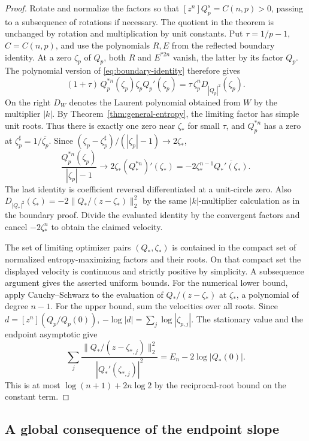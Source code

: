 \documentclass[11pt]{article}
\begin{document}
\begin{proof}
Rotate and normalize the factors so that \([z^n]Q_p^s=C(n,p)>0\),
passing to a subsequence of rotations if necessary. The quotient
in the theorem is unchanged by rotation and multiplication by
unit constants. Put \(\tau=1/p-1\), \(C=C(n,p)\), and use the
polynomials \(R,E\) from the reflected boundary identity. At a
zero \(\zeta_p\) of \(Q_p\), both \(R\) and \(E^{*2n}\) vanish,
the latter by its factor \(Q_p\). The polynomial version of
\eqref{eq:boundary-identity} therefore gives
\[
 (1+\tau)\,Q_p^{*n}(\zeta_p)\zeta_p Q_p'(\zeta_p)
   = \tau\,\zeta_p^n D_{|Q_p|^2}(\zeta_p).
\]
On the right \(D_W\) denotes the Laurent polynomial obtained
from \(W\) by the multiplier \(|k|\).
By Theorem~\ref{thm:general-entropy}, the limiting factor has
simple unit roots. Thus there is exactly one zero near
\(\zeta_*\) for small \(\tau\), and \(Q_p^{*n}\) has a zero at
\(\zeta_p^\sharp=1/\overline{\zeta_p}\). Since
\((\zeta_p-\zeta_p^\sharp)/(|\zeta_p|-1)\to2\zeta_*\),
\[
 \frac{Q_p^{*n}(\zeta_p)}
      {|\zeta_p|-1}
 \longrightarrow 2\zeta_*(Q_*^{*n})'(\zeta_*)
 =-2\zeta_*^{n-1}\overline{Q_*'(\zeta_*)}.
\]
The last identity is coefficient reversal differentiated at
a unit-circle zero. Also
\(D_{|Q_*|^2}(\zeta_*)=-2\|Q_*/(z-\zeta_*)\|_2^2\)
by the same \(|k|\)-multiplier calculation as in the boundary
proof. Divide the evaluated identity by the convergent factors
and cancel \(-2\zeta_*^n\) to obtain the claimed velocity.

The set of limiting optimizer pairs \((Q_*,\zeta_*)\) is
contained in the compact set of normalized entropy-maximizing
factors and their roots. On that compact set the displayed
velocity is continuous and strictly positive by simplicity.
A subsequence argument gives the asserted uniform bounds.
For the numerical lower bound, apply Cauchy--Schwarz to
the evaluation of \(Q_*/(z-\zeta_*)\) at \(\zeta_*\),
a polynomial of degree \(n-1\). For the upper bound,
sum the velocities over all roots. Since \(d=[z^n](Q_p/Q_p(0))\),
\(-\log|d|=\sum_j\log|\zeta_{p,j}|\). The stationary value
and the endpoint asymptotic give
\[
 \sum_j\frac{\|Q_*/(z-\zeta_{*,j})\|_2^2}
                  {|Q_*'(\zeta_{*,j})|^2}
     =E_n-2\log|Q_*(0)|.
\]
This is at most \(\log(n+1)+2n\log2\) by the reciprocal-root
bound on the constant term.
\end{proof}

\subsection{A global consequence of the endpoint slope}
\end{document}
